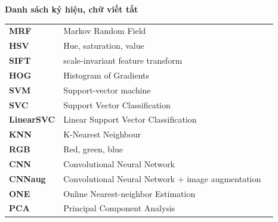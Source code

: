 \documentclass[12pt]{report}
\begin{document}
		\newpage
		\listoftables
																																																																						
		\newpage
		\begin{flushleft}
			\bfseries{\Huge{Danh sách ký hiệu, chữ viết tắt}}
		\end{flushleft}
		\begin{table}[h]
			\centering
			\begin{tabular}{lll}
				\textbf{MRF}       & Markov Random Field                               \\[0.3cm]
				\textbf{HSV}       & Hue, saturation, value                            \\[0.3cm]
				\textbf{SIFT}      & scale-invariant feature transform                 \\[0.3cm]
				\textbf{HOG}       & Histogram of Gradients                            \\[0.3cm]
				\textbf{SVM}       & Support-vector machine                            \\[0.3cm]
				\textbf{SVC}       & Support Vector Classification                     \\[0.3cm]
				\textbf{LinearSVC} & Linear Support Vector Classification              \\[0.3cm]
				\textbf{KNN}       & K-Nearest Neighbour                               \\[0.3cm]
				\textbf{RGB}       & Red, green, blue                                  \\[0.3cm]
				\textbf{CNN}       & Convolutional Neural Network                      \\[0.3cm]
				\textbf{CNNaug}    & Convolutional Neural Network + image augmentation \\[0.3cm]
				\textbf{ONE}       & Online Nearest-neighbor Estimation                \\[0.3cm]
				\textbf{PCA}       & Principal Component Analysis                      \\[0.3cm]
																																																																																																																																														
			\end{tabular}
		\end{table}
																																																																						
\end{document}
